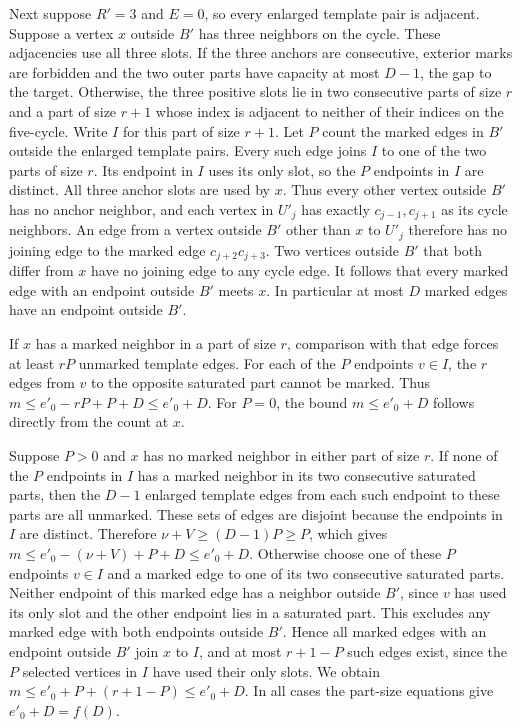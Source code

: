 \documentclass[preprint,11pt,numbers]{elsarticle-arxiv}
\numberwithin{equation}{section}
\theoremstyle{definition}
\begin{document}
Next suppose $R'=3$ and $E=0$, so every enlarged template pair
is adjacent. Suppose a vertex $x$ outside $B'$ has three
neighbors on the cycle.
These adjacencies use all three slots. If the three anchors
are consecutive, exterior marks are forbidden and the two outer
parts have capacity at most $D-1$, the gap to the target.
Otherwise, the three positive slots lie in two consecutive parts
of size $r$ and a part of size $r+1$ whose index is adjacent to
neither of their indices on the five-cycle.
Write $I$ for this part of size $r+1$. Let $P$ count the marked
edges in $B'$ outside the enlarged template pairs. Every such edge
joins $I$ to one of the two parts of size $r$. Its endpoint in $I$
uses its only slot, so the $P$ endpoints in $I$ are distinct.
All three anchor slots are used by $x$. Thus every other vertex
outside $B'$ has no anchor neighbor, and each vertex in $U'_j$
has exactly $c_{j-1},c_{j+1}$ as its cycle neighbors. An edge
from a vertex outside $B'$ other than $x$ to $U'_j$ therefore
has no joining edge to the marked edge $c_{j+2}c_{j+3}$. Two
vertices outside $B'$ that both differ from $x$ have no joining
edge to any cycle edge. It follows that every marked edge with
an endpoint outside $B'$ meets $x$. In particular at most $D$
marked edges have an endpoint outside $B'$.

If $x$ has a marked neighbor in a part of size $r$, comparison
with that edge forces at least $rP$ unmarked template edges.
For each of the $P$ endpoints $v\in I$, the $r$ edges from
$v$ to the opposite saturated part cannot be marked. Thus
$m\leq e'_0-rP+P+D\leq e'_0+D$. For $P=0$, the bound
$m\leq e'_0+D$ follows directly from the count at $x$.

Suppose $P>0$ and $x$ has no marked neighbor in either part of
size $r$. If none of the $P$ endpoints in $I$ has a marked
neighbor in its two consecutive saturated parts, then the
$D-1$ enlarged template edges from each such endpoint to
these parts are all unmarked. These sets of edges are disjoint
because the endpoints in $I$ are distinct. Therefore
$\nu+V\geq(D-1)P\geq P$, which gives
$m\leq e'_0-(\nu+V)+P+D\leq e'_0+D$.
Otherwise choose one of these $P$ endpoints $v\in I$ and a
marked edge to one of its two consecutive saturated parts.
Neither endpoint of this marked edge has a neighbor outside
$B'$, since $v$ has used its only slot and the other endpoint
lies in a saturated part. This excludes any marked edge with
both endpoints outside $B'$. Hence all marked edges with
an endpoint outside $B'$ join $x$ to $I$, and at most
$r+1-P$ such edges exist, since the $P$ selected vertices in $I$
have used their only slots. We obtain
$m\leq e'_0+P+(r+1-P)\leq e'_0+D$. In all cases the
part-size equations give $e'_0+D=f(D)$.
\end{document}
